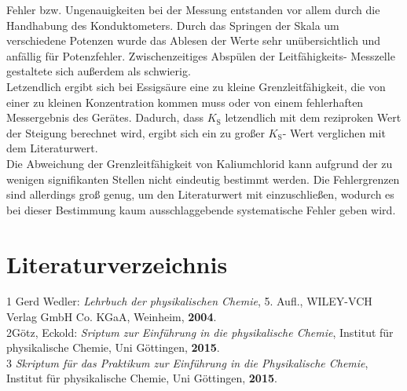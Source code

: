 \documentclass[12pt,a4paper,titlepage,headinclude,bibtotoc]{scrartcl}
\begin{document}
Fehler bzw. Ungenauigkeiten bei der Messung entstanden vor allem durch die Handhabung des Konduktometers. Durch das Springen der Skala um verschiedene Potenzen wurde das Ablesen der Werte sehr unübersichtlich und anfällig für Potenzfehler. Zwischenzeitiges Abspülen der Leitfähigkeits- Messzelle gestaltete sich außerdem als schwierig. \\

Letzendlich ergibt sich bei Essigsäure eine zu kleine Grenzleitfähigkeit, die von einer zu kleinen Konzentration kommen muss oder von einem fehlerhaften Messergebnis des Gerätes. Dadurch, dass $K_\mathrm{S}$ letzendlich mit dem reziproken Wert der Steigung berechnet wird, ergibt sich ein zu großer $K_\mathrm{S}$- Wert verglichen mit dem Literaturwert. \\
Die Abweichung der Grenzleitfähigkeit von Kaliumchlorid kann aufgrund der zu wenigen signifikanten Stellen nicht eindeutig bestimmt werden. Die Fehlergrenzen sind allerdings groß genug, um den Literaturwert mit einzuschließen, wodurch es bei dieser Bestimmung kaum ausschlaggebende systematische Fehler geben wird. \\

\newpage

\section{Literaturverzeichnis}
\begin{flushleft}
1 \quad Gerd Wedler: \emph{Lehrbuch der physikalischen Chemie}, 5. Aufl., WILEY-VCH Verlag GmbH Co. KGaA, Weinheim, \textbf{2004}.\\
\vspace{0,5 cm}
2\quad Götz, Eckold: \emph{Sriptum zur Einführung in die physikalische Chemie}, Institut für physikalische Chemie, Uni Göttingen, \textbf{2015}.\\
\vspace{0,5 cm}
3 \quad \emph{Skriptum für das Praktikum zur Einführung in die Physikalische Chemie}, Institut für physikalische Chemie, Uni Göttingen, \textbf{2015}.\\
\end{flushleft}
\end{document}
